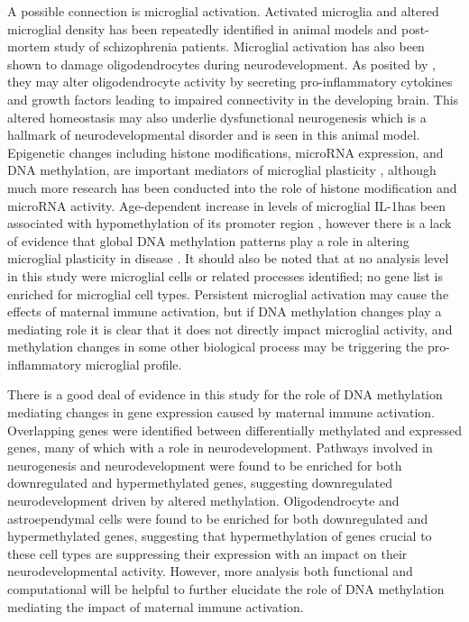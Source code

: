 \documentclass{bioinfo}
\begin{document}
\begin{discussion}
A possible connection is microglial activation. Activated microglia and altered microglial density has been repeatedly identified in animal models and post-mortem study of schizophrenia patients. Microglial activation has also been shown to damage oligodendrocytes during neurodevelopment. As posited by \cite{cassoli_disturbed_2015}, they may alter oligodendrocyte activity by secreting pro-inflammatory cytokines and growth factors leading to impaired connectivity in the developing brain. This altered homeostasis may also underlie dysfunctional neurogenesis which is a hallmark of neurodevelopmental disorder and is seen in this animal model. Epigenetic changes including histone modifications, microRNA expression, and DNA methylation, are important mediators of microglial plasticity \citep{}, although much more research has been conducted into the role of histone modification and microRNA activity. Age-dependent increase in levels of microglial IL-1\beta has been associated with hypomethylation of its promoter region \citep{matt_aging_2016}, however there is a lack of evidence that global DNA methylation patterns play a role in altering microglial plasticity in disease \citep{coppieters_global_2014, phipps_neurofilament-labeled_2016}. It should also be noted that at no analysis level in this study were microglial cells or related processes identified; no gene list is enriched for microglial cell types. Persistent microglial activation may cause the effects of maternal immune activation, but if DNA methylation changes play a mediating role it is clear that it does not directly impact microglial activity, and methylation changes in some other biological process may be triggering the pro-inflammatory microglial profile.

There is a good deal of evidence in this study for the role of DNA methylation mediating changes in gene expression caused by maternal immune activation. Overlapping genes were identified between differentially methylated and expressed genes, many of which with a role in neurodevelopment. Pathways involved in neurogenesis and neurodevelopment were found to be enriched for both downregulated and hypermethylated genes, suggesting downregulated neurodevelopment driven by altered methylation. Oligodendrocyte and astroependymal cells were found to be enriched for both downregulated and hypermethylated genes, suggesting that hypermethylation of genes crucial to these cell types are suppressing their expression with an impact on their neurodevelopmental activity. However, more analysis both functional and computational will be helpful to further elucidate the role of DNA methylation mediating the impact of maternal immune activation.

\end{discussion}
\end{document}
